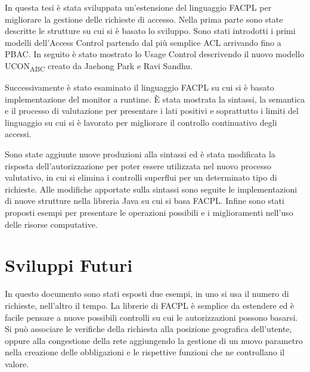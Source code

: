 \label{chap:Conclusioni}
In questa tesi è stata sviluppata un'estensione del linguaggio \ac{FACPL} per migliorare la gestione delle richieste di accesso.
Nella prima parte sono state descritte le strutture su cui si è basato lo sviluppo. Sono stati introdotti i primi modelli
dell'Access Control partendo dal più semplice \ac{ACL} arrivando fino a \ac{PBAC}. In seguito è stato mostrato lo Usage Control
descrivendo il nuovo modello UCON\textsubscript{ABC} creato da Jaehong Park e Ravi Sandhu.

Successivamente è stato esaminato il linguaggio \ac{FACPL} su cui si è basato implementazione del monitor a runtime.
\MakeUppercase{è} stata mostrata la sintassi, la semantica e il processo di valutazione per presentare i lati positivi
e soprattutto i limiti del linguaggio su cui si è lavorato per migliorare il controllo continuativo degli accessi.

Sono state aggiunte nuove produzioni alla sintassi ed è stata modificata la risposta dell'autorizzazione per poter
essere utilizzata nel nuovo processo valutativo, in cui si elimina i controlli superflui per un determinato tipo di richieste.
Alle modifiche apportate sulla sintassi sono seguite le implementazioni di nuove strutture nella libreria Java su cui si
basa \ac{FACPL}. Infine sono stati proposti esempi per presentare le operazioni possibili e i miglioramenti nell'uso delle
risorse computative.

\section{Sviluppi Futuri}
\label{sec:Sviluppi Futuri}
In questo documento sono stati esposti due esempi, in uno si usa il numero di richieste, nell'altro il tempo.
La librerie di \ac{FACPL} è semplice da estendere ed è facile pensare a nuove possibili controlli su cui
le autorizzazioni possono basarsi. Si può associare le verifiche della richiesta alla posizione
geografica dell'utente, oppure alla congestione della rete aggiungendo la gestione di un nuovo parametro nella
creazione delle obbligazioni e le rispettive funzioni che ne controllano il valore. 
